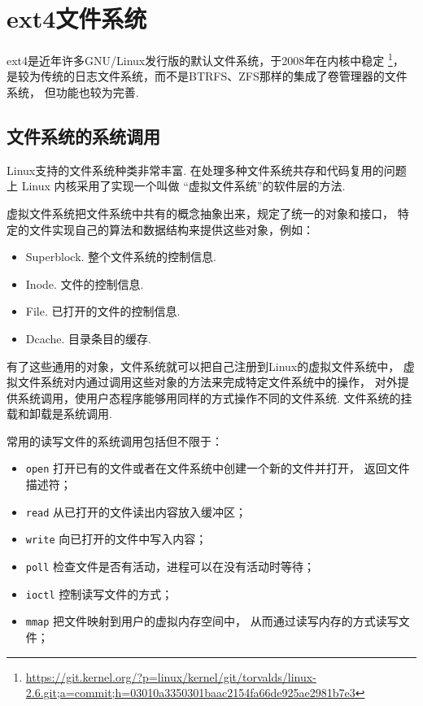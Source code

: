 \section{ext4文件系统}
ext4是近年许多GNU/Linux发行版的默认文件系统，于2008年在内核中稳定
\footnote{\url{https://git.kernel.org/?p=linux/kernel/git/torvalds/linux-2.6.git;a=commit;h=03010a3350301baac2154fa66de925ae2981b7e3}}，
是较为传统的日志文件系统，而不是BTRFS、ZFS那样的集成了卷管理器的文件系统，
但功能也较为完善.

\subsection{文件系统的系统调用}
Linux支持的文件系统种类非常丰富.
在处理多种文件系统共存和代码复用的问题上 Linux 内核采用了实现一个叫做
“虚拟文件系统”的软件层的方法.

虚拟文件系统把文件系统中共有的概念抽象出来，规定了统一的对象和接口，
特定的文件实现自己的算法和数据结构来提供这些对象，例如：
\begin{itemize}
	\item Superblock. 整个文件系统的控制信息.
	\item Inode. 文件的控制信息.
	\item File. 已打开的文件的控制信息.
	\item Dcache. 目录条目的缓存.
\end{itemize}
有了这些通用的对象，文件系统就可以把自己注册到Linux的虚拟文件系统中，
虚拟文件系统对内通过调用这些对象的方法来完成特定文件系统中的操作，
对外提供系统调用，使用户态程序能够用同样的方式操作不同的文件系统.
文件系统的挂载和卸载是系统调用.

常用的读写文件的系统调用包括但不限于：
\begin{itemize}
	\item \lstinline{open} 打开已有的文件或者在文件系统中创建一个新的文件并打开，
	      返回文件描述符；
	\item \lstinline{read} 从已打开的文件读出内容放入缓冲区；
	\item \lstinline{write} 向已打开的文件中写入内容；
	\item \lstinline{poll} 检查文件是否有活动，进程可以在没有活动时等待；
	\item \lstinline{ioctl} 控制读写文件的方式；
	\item \lstinline{mmap} 把文件映射到用户的虚拟内存空间中，
	      从而通过读写内存的方式读写文件；
\end{itemize}

